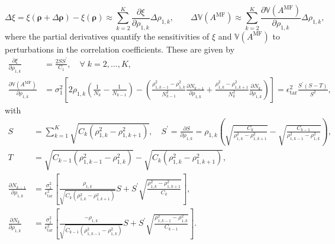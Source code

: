 %
\[
\Delta\xi=\xi(\boldsymbol{\rho}+\Delta \boldsymbol{\rho}) - \xi(\boldsymbol{\rho}) \approx \sum_{k=2}^K \frac{\partial \xi}{\partial \rho_{1,k}} \Delta\rho_{1,k},\quad \quad \Delta \mathbb{V}\left(A^{\text{MF}}\right)\approx \sum_{k=2}^K \frac{\partial  \mathbb{V}\left(A^{\text{MF}}\right)}{\partial  \rho_{1,k}}  \Delta\rho_{1,k},
\]
%
where the partial derivatives quantify the sensitivities of $\xi$ and $\mathbb{V}(A^{\text{MF}})$ to perturbations in the correlation coefficients. These are given by
%
\begin{align}
\label{eq:partial_xi_rho}
    \frac{\partial  \xi}{\partial  \rho_{1,k}} 
&=\frac{2SS^\prime}{C_1}, \quad \forall\; k=2,\ldots, K,\\
\label{eq:partial_var_rho}
\frac{\partial  \mathbb{V}\left(A^{\text{MF}}\right)}{\partial  \rho_{1,k}} 
&=\sigma_1^2\left[2\rho_{1,k}\left(\frac{1}{N_{k}} - \frac{1}{N_{k-1}}\right)-\left( \frac{\rho_{1,k-1}^2 -\rho_{1,k}^2 }{N_{k-1}^2}\frac{\partial N_{k-1}}{\partial  \rho_{1,k}}+\frac{\rho_{1,k}^2 -\rho_{1,k+1}^2 }{N_k^2}\frac{\partial N_k}{\partial  \rho_{1,k}}\right)\right]=\epsilon_{\text{tar}}^2\frac{S^\prime \left(S-T\right)}{S^2},
\end{align}
%
with
%
\begin{align}
S& = \sum_{k=1}^K\sqrt{C_k\left(\rho_{1,k}^2-\rho_{1,k+1}^2\right)},\quad
S^\prime = \frac{\partial  S}{\partial  \rho_{1,k}} = \rho_{1,k}\left(\sqrt{\frac{C_k}{\rho_{1,k}^2-\rho_{1,k+1}^2}} - \sqrt{\frac{C_{k-1}}{\rho_{1,k-1}^2-\rho_{1,k}^2}}\right),\\
\nonumber
T &=  \sqrt{C_{k-1}\left(\rho_{1,k-1}^2 - \rho_{1,k}^2\right)} - \sqrt{C_{k}\left(\rho_{1,k}^2 - \rho_{1,k+1}^2\right)},\\
\nonumber
\frac{\partial N_{k-1}}{\partial  \rho_{1,k}}&=\frac{\sigma_1^2}{\epsilon_{\text{tar}}^2}\left[\frac{\rho_{1,k}}{\sqrt{C_{k}\left(\rho_{1,k}^2 - \rho_{1,k+1}^2\right)}}S+S^\prime \sqrt{\frac{\rho_{1,k}^2 - \rho_{1,k+1}^2}{C_{k}}}\right],\\
\nonumber
\frac{\partial N_{k}}{\partial  \rho_{1,k}}&=\frac{\sigma_1^2}{\epsilon_{\text{tar}}^2}\left[\frac{-\rho_{1,k}}{\sqrt{C_{k-1}\left(\rho_{1,k-1}^2 - \rho_{1,k}^2\right)}}S+S^\prime \sqrt{\frac{\rho_{1,k-1}^2 - \rho_{1,k}^2}{C_{k-1}}}\right].
\end{align}
